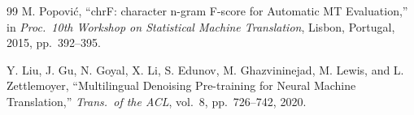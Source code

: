 \documentclass[sigconf,screen]{ceurart}
\begin{document}
\begin{thebibliography}{99}
M. Popovi\'{c},
``chrF: character n-gram F-score for Automatic MT Evaluation,''
in \textit{Proc.\ 10th Workshop on Statistical Machine Translation},
Lisbon, Portugal, 2015, pp.~392--395.

Y. Liu, J. Gu, N. Goyal, X. Li, S. Edunov, M. Ghazvininejad,
M. Lewis, and L. Zettlemoyer,
``Multilingual Denoising Pre-training for Neural Machine Translation,''
\textit{Trans.\ of the ACL}, vol.~8, pp.~726--742, 2020.

\end{thebibliography}
\end{document}
